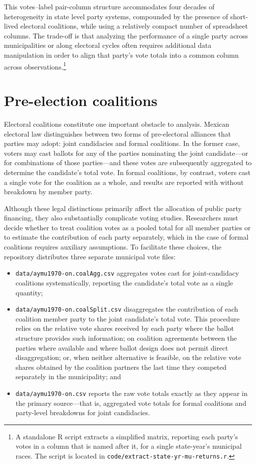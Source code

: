 \documentclass[letter,12pt]{article}
\begin{document}
This votes--label pair-column structure accommodates four decades of heterogeneity in state level party systems, compounded by the presence of short-lived electoral coalitions, while using a relatively compact number of spreadsheet columns. The trade-off is that analyzing the performance of a single party across municipalities or along electoral cycles often requires additional data manipulation in order to align that party's vote totals into a common column across observations.\footnote{A standalone R script extracts a simplified matrix, reporting each party's votes in a column that is named after it, for a single state-year's municipal races. The script is located in \verb|code/extract-state-yr-mu-returns.r|.}

\section{Pre-election coalitions}\label{S:coalitions}

Electoral coalitions constitute one important obstacle to analysis. Mexican electoral law distinguishes between two forms of pre-electoral alliances that parties may adopt: joint candidacies and formal coalitions. In the former case, voters may cast ballots for any of the parties nominating the joint candidate---or for combinations of those parties---and these votes are subsequently aggregated to determine the candidate's total vote. In formal coalitions, by contrast, voters cast a single vote for the coalition as a whole, and results are reported with without breakdown by member party.

Although these legal distinctions primarily affect the allocation of public party financing, they also substantially complicate voting studies. Researchers must decide whether to treat coalition votes as a pooled total for all member parties or to estimate the contribution of each party separately, which in the case of formal coalitions requires auxiliary assumptions. To facilitate these choices, the repository distributes three separate municipal vote files:

\begin{itemize}
\item \verb|data/aymu1970-on.coalAgg.csv| aggregates votes cast for joint-candidacy coalitions systematically, reporting the candidate's total vote as a single quantity;
\item \verb|data/aymu1970-on.coalSplit.csv| disaggregates the contribution of each coalition member party to the joint candidate's total vote. This procedure relies on the relative vote shares received by each party where the ballot structure provides such information; on coalition agreements between the parties where available and where ballot design does not permit direct disaggregation; or, when neither alternative is feasible, on the relative vote shares obtained by the coalition partners the last time they competed separately in the municipality; and
\item \verb|data/aymu1970-on.csv| reports the raw vote totals exactly as they appear in the primary source---that is, aggregated vote totals for formal coalitions and party-level breakdowns for joint candidacies.
\end{itemize}
\end{document}
